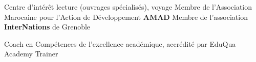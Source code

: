 
\begin{rubric}{Centre d’intérêt}
\entry*[]%
 lecture (ouvrages spécialisés), voyage
%
\entry*[] Membre de l’Association Marocaine pour l’Action de Développement \textbf{AMAD}
\entry*[] Membre de l’association \textbf{InterNations} de Grenoble

\entry*[] Coach en Compétences de l'excellence académique, accrédité par EduQua Academy Trainer

\end{rubric}

